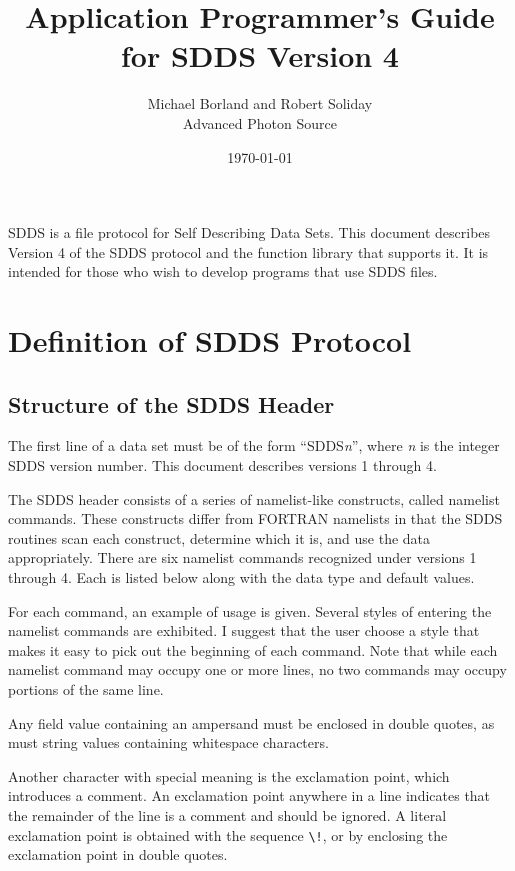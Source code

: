 \documentclass[11pt]{article}
\begin{document}
\title{Application Programmer's Guide for SDDS Version 4}
\author{Michael Borland and Robert Soliday\\Advanced Photon Source\\ \date{\today}}
\maketitle

SDDS is a file protocol for Self Describing Data Sets. This document describes Version 4 of the SDDS protocol and the function library that supports it. It is intended for those who wish to develop programs that use SDDS files.

\section{Definition of SDDS Protocol}

\subsection{Structure of the SDDS Header}
\label{sect:header}

The first line of a data set must be of the form ``SDDS{\em n}'', where {\em n} is the integer SDDS version number. This document describes versions 1 through 4.

The SDDS header consists of a series of namelist-like constructs, called namelist commands.  These constructs differ from FORTRAN namelists in that the SDDS routines scan each construct, determine which it is, and use the data appropriately. There are six namelist commands recognized under versions 1 through 4.  Each is listed below along with the data type and default values.

For each command, an example of usage is given.  Several styles of entering the namelist commands are exhibited.  I suggest that the user choose a style that makes it easy to pick out the beginning of each command.  Note that while each namelist command may occupy one or more lines, no two commands may occupy portions of the same line.

Any field value containing an ampersand must be enclosed in double quotes, as must string values containing whitespace characters.

Another character with special meaning is the exclamation point, which introduces a comment.  An exclamation point anywhere in a line indicates that the remainder of the line is a comment and should be ignored.  A literal exclamation point is obtained with the sequence \verb|\!|, or by enclosing the exclamation point in double quotes.
\end{document}

